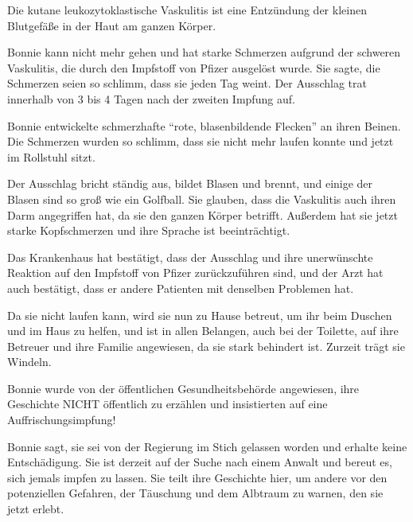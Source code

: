 Die kutane leukozytoklastische Vaskulitis ist eine Entzündung der kleinen
Blutgefäße in der Haut am ganzen Körper.

Bonnie kann nicht mehr gehen und hat starke Schmerzen aufgrund der schweren
Vaskulitis, die durch den Impfstoff von Pfizer ausgelöst wurde. Sie sagte, die
Schmerzen seien so schlimm, dass sie jeden Tag weint. Der Ausschlag trat
innerhalb von 3 bis 4 Tagen nach der zweiten Impfung auf.

Bonnie entwickelte schmerzhafte ``rote, blasenbildende Flecken'' an ihren
Beinen. Die Schmerzen wurden so schlimm, dass sie nicht mehr laufen konnte und
jetzt im Rollstuhl sitzt.

Der Ausschlag bricht ständig aus, bildet Blasen und brennt, und einige der
Blasen sind so groß wie ein Golfball. Sie glauben, dass die Vaskulitis auch
ihren Darm angegriffen hat, da sie den ganzen Körper betrifft. Außerdem hat sie
jetzt starke Kopfschmerzen und ihre Sprache ist beeinträchtigt.

Das Krankenhaus hat bestätigt, dass der Ausschlag und ihre unerwünschte Reaktion
auf den Impfstoff von Pfizer zurückzuführen sind, und der Arzt hat auch
bestätigt, dass er andere Patienten mit denselben Problemen hat.

Da sie nicht laufen kann, wird sie nun zu Hause betreut, um ihr beim Duschen und
im Haus zu helfen, und ist in allen Belangen, auch bei der Toilette, auf ihre
Betreuer und ihre Familie angewiesen, da sie stark behindert ist. Zurzeit trägt
sie Windeln.

Bonnie wurde von der öffentlichen Gesundheitsbehörde angewiesen, ihre Geschichte
NICHT öffentlich zu erzählen und insistierten auf eine Auffrischungsimpfung!

Bonnie sagt, sie sei von der Regierung im Stich gelassen worden und erhalte
keine Entschädigung. Sie ist derzeit auf der Suche nach einem Anwalt und bereut
es, sich jemals impfen zu lassen. Sie teilt ihre Geschichte hier, um andere vor
den potenziellen Gefahren, der Täuschung und dem Albtraum zu warnen, den sie
jetzt erlebt.
